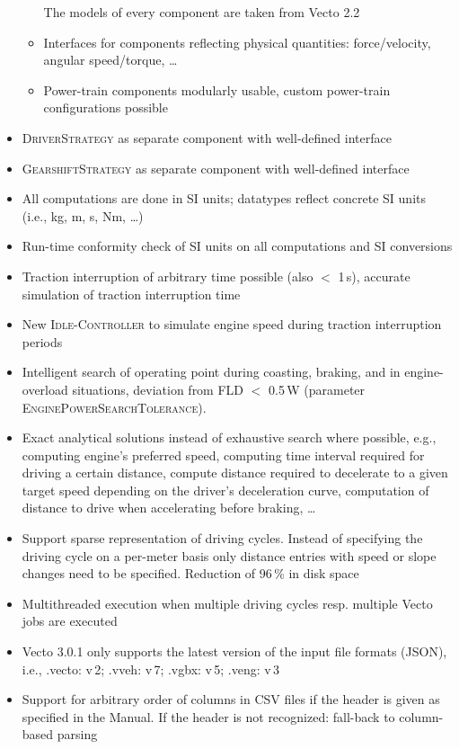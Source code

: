 \begin{itemize}
\begin{itemize}
		The models of every component are taken from Vecto 2.2
		\item Interfaces for components reflecting physical quantities:
		force/velocity, angular speed/torque, \ldots
		\item Power-train components modularly usable, custom power-train configurations possible
	\end{itemize}
	\item \textsc{DriverStrategy} as separate component with well-defined interface
	\item \textsc{GearshiftStrategy} as separate component with well-defined interface
	\item All computations are done in SI units; datatypes reflect concrete SI units (i.e., kg, m, s, Nm, \ldots)
	\item Run-time conformity check of SI units on all computations and SI conversions
	\item Traction interruption of arbitrary time possible (also $<$ 1\,s), accurate simulation of traction interruption time
	\item New \textsc{Idle-Controller} to simulate engine speed during traction interruption periods
	\item Intelligent search of operating point during coasting, braking, and in engine-overload situations, deviation from FLD $<$ 0.5\,W (parameter \textsc{EnginePowerSearchTolerance}).
	\item Exact analytical solutions instead of exhaustive search where possible, e.g., computing engine's preferred speed, computing time interval required for driving a certain distance, compute distance required to decelerate to a given target speed depending on the driver's deceleration curve, computation of distance to drive when accelerating before braking, \ldots
	\item Support sparse representation of driving cycles. Instead of specifying the driving cycle on a per-meter basis only distance entries with speed or slope changes need to be specified. Reduction of 96\,\% in disk space
	\item Multithreaded execution when multiple driving cycles resp. multiple Vecto jobs are executed
	\item Vecto 3.0.1 only supports the latest version of the input file formats (JSON), i.e., .vecto: v\,2; .vveh: v\,7; .vgbx: v\,5; .veng: v\,3
	\item Support for arbitrary order of columns in CSV files if the header is given as specified in the Manual. If the header is not recognized: fall-back to column-based parsing

\end{itemize}
